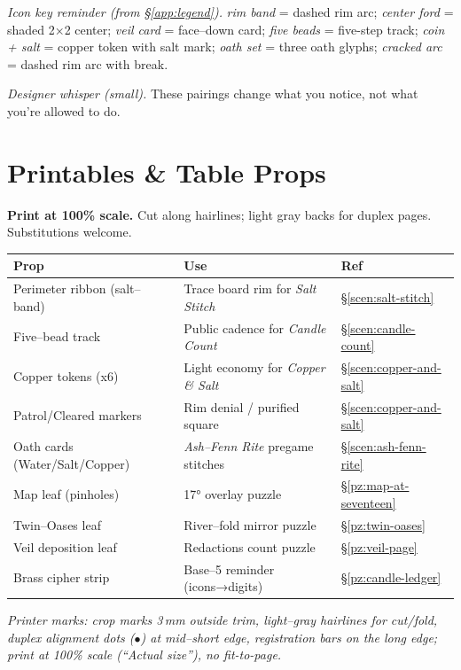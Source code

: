 \documentclass[11pt]{article}
\numberwithin{equation}{section} %
\theoremstyle{plain} %
\theoremstyle{definition} %
\theoremstyle{remark} %
\begin{document}
\medskip
\noindent\textit{Icon key reminder (from \S\ref{app:legend}).} \textit{rim band} = dashed rim arc; \textit{center ford} = shaded 2×2 center; \textit{veil card} = face–down card; \textit{five beads} = five-step track; \textit{coin + salt} = copper token with salt mark; \textit{oath set} = three oath glyphs; \textit{cracked arc} = dashed rim arc with break.

\medskip
\noindent\textit{Designer whisper (small).} These pairings change what you notice, not what you’re allowed to do.

\clearpage
\section{Printables \& Table Props}
\label{app:printables}

\noindent\textbf{Print at 100\% scale.} Cut along hairlines; light gray backs for duplex pages. Substitutions welcome.

\medskip
\begin{tabular}{p{5.2cm} p{5.6cm} p{3.7cm}}
\toprule
\textbf{Prop} & \textbf{Use} & \textbf{Ref}\\
\midrule
Perimeter ribbon (salt–band) & Trace board rim for \emph{Salt Stitch} & \S\ref{scen:salt-stitch}\\
Five–bead track & Public cadence for \emph{Candle Count} & \S\ref{scen:candle-count}\\
Copper tokens (x6) & Light economy for \emph{Copper \& Salt} & \S\ref{scen:copper-and-salt}\\
Patrol/Cleared markers & Rim denial / purified square & \S\ref{scen:copper-and-salt}\\
Oath cards (Water/Salt/Copper) & \emph{Ash–Fenn Rite} pregame stitches & \S\ref{scen:ash-fenn-rite}\\
Map leaf (pinholes) & 17° overlay puzzle & \S\ref{pz:map-at-seventeen}\\
Twin–Oases leaf & River–fold mirror puzzle & \S\ref{pz:twin-oases}\\
Veil deposition leaf & Redactions count puzzle & \S\ref{pz:veil-page}\\
Brass cipher strip & Base–5 reminder (icons→digits) & \S\ref{pz:candle-ledger}\\
\bottomrule
\end{tabular}
\medskip
\noindent\textit{Printer marks: crop marks 3\,mm outside trim, light–gray hairlines for cut/fold, duplex alignment dots (\(\bullet\)) at mid–short edge, registration bars on the long edge; print at 100\% scale (“Actual size”), no fit-to-page.}
\end{document}
